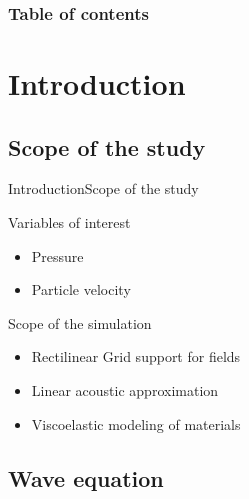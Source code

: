 \documentclass[9pt, xcolor={usenames, dvipsnames}]{beamer}
\begin{document}
		\begin{frame}
			\partpage
		\end{frame}

		\begin{frame}
			\frametitle{Table of contents}
			\tableofcontents%
		\end{frame}

		\section{Introduction}

			\subsection{Scope of the study}

				\begin{frame}{Introduction}{Scope of the study}
					\centering
					\begin{minipage}{0.6\textwidth}
						\begin{block}{Variables of interest}
							\begin{itemize}
								\item Pressure
								\item Particle velocity
							\end{itemize}
						\end{block}
						\begin{block}{Scope of the simulation}
							\begin{itemize}
								\item Rectilinear Grid support for fields
								\item Linear acoustic approximation
								\item Viscoelastic modeling of materials
							\end{itemize}
						\end{block}
					\end{minipage}
				\end{frame}

			\subsection{Wave equation}
\end{document}
